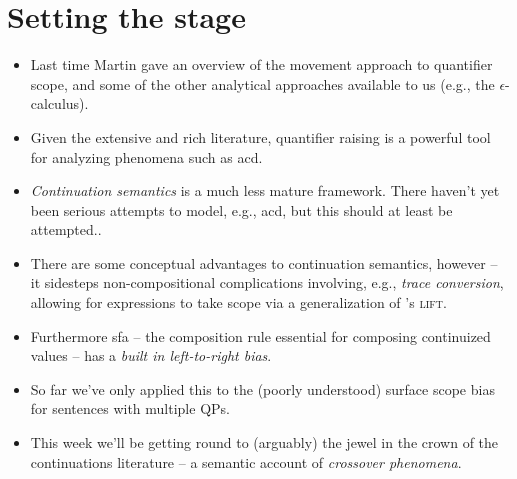 \documentclass[nols,twoside,nofonts,nobib,nohyper]{tufte-handout}
\begin{document}
\section{Setting the stage}

\begin{itemize}

    \item Last time Martin gave an overview of the movement
    approach to quantifier scope, and some of the other analytical approaches
    available to us (e.g., the $ϵ$-calculus).

    \item Given the extensive and rich literature, quantifier raising is
    a powerful tool for analyzing phenomena such as \ac{acd}.

    \item \textit{Continuation semantics} is a much less mature framework. There
    haven't yet been serious attempts to model, e.g., \ac{acd}, but this should
    at least be attempted..

    \item There are some conceptual advantages to continuation semantics,
    however -- it sidesteps non-compositional complications involving, e.g., \textit{trace
    conversion}, allowing
    for expressions to take scope via a generalization of
    \citeauthor{partee1986}'s \textsc{lift}.

    \item Furthermore \ac{sfa} -- the composition rule essential for composing
    continuized values -- has a \textit{built in left-to-right bias}.

    \item So far we've only applied this to the (poorly understood) surface
    scope bias for sentences with multiple QPs.

    \item This week we'll be getting round to (arguably) the jewel in the crown
    of the continuations literature -- a semantic account of \textit{crossover phenomena}.


\end{itemize}
\end{document}
